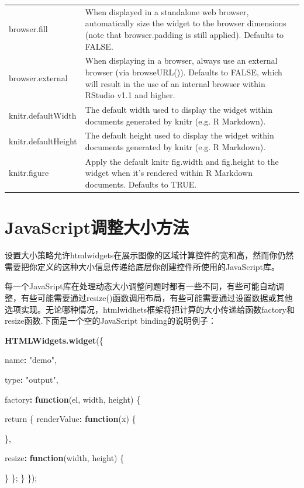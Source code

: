 \documentclass[]{book}
\newenvironment{Shaded}{\begin{snugshade}}{\end{snugshade}}
\newcommand{\KeywordTok}[1]{\textcolor[rgb]{0.13,0.29,0.53}{\textbf{#1}}}
\newcommand{\StringTok}[1]{\textcolor[rgb]{0.31,0.60,0.02}{#1}}
\newcommand{\ControlFlowTok}[1]{\textcolor[rgb]{0.13,0.29,0.53}{\textbf{#1}}}
\newcommand{\OperatorTok}[1]{\textcolor[rgb]{0.81,0.36,0.00}{\textbf{#1}}}
\newcommand{\NormalTok}[1]{#1}
\theoremstyle{definition}
\theoremstyle{definition}
\theoremstyle{definition}
\theoremstyle{remark}
\begin{document}
\begin{tabular}{ll}
browser.fill & When displayed in a standalone web browser, automatically size the widget to the browser dimensions (note that browser.padding is still applied). Defaults to FALSE.\\
browser.external & When displaying in a browser, always use an external browser (via browseURL()). Defaults to FALSE, which will result in the use of an internal browser within RStudio v1.1 and higher.\\
knitr.defaultWidth & The default width used to display the widget within documents generated by knitr (e.g. R Markdown).\\
\addlinespace
knitr.defaultHeight & The default height used to display the widget within documents generated by knitr (e.g. R Markdown).\\
knitr.figure & Apply the default knitr fig.width and fig.height to the widget when it’s rendered within R Markdown documents. Defaults to TRUE.\\
\bottomrule
\end{tabular}

\section{JavaScript调整大小方法}\label{javascript}

设置大小策略允许htmlwidgets在展示图像的区域计算控件的宽和高，然而你仍然需要把你定义的这种大小信息传递给底层你创建控件所使用的JavaScript库。

每一个JavaSript库在处理动态大小调整问题时都有一些不同，有些可能自动调整，有些可能需要通过resize()函数调用布局，有些可能需要通过设置数据或其他选项实现。无论哪种情况，htmlwidhets框架将把计算的大小传递给函数factory和resize函数.下面是一个空的JavaScript
binding的说明例子：

\begin{Shaded}
\begin{Highlighting}[]
\KeywordTok{HTMLWidgets.widget}\NormalTok{(\{}

\NormalTok{  name}\OperatorTok{:}\StringTok{ "demo"}\NormalTok{,}
  
\NormalTok{  type}\OperatorTok{:}\StringTok{ "output"}\NormalTok{,}
  
\NormalTok{  factory}\OperatorTok{:}\StringTok{ }\ControlFlowTok{function}\NormalTok{(el, width, height) \{}
  
\NormalTok{    return \{}
\NormalTok{      renderValue}\OperatorTok{:}\StringTok{ }\ControlFlowTok{function}\NormalTok{(x) \{}
      
\NormalTok{      \},}
      
\NormalTok{      resize}\OperatorTok{:}\StringTok{ }\ControlFlowTok{function}\NormalTok{(width, height) \{}
        
\NormalTok{      \}}
\NormalTok{    \};}
\NormalTok{  \}}
\NormalTok{\});}
\end{Highlighting}
\end{Shaded}
\end{document}

